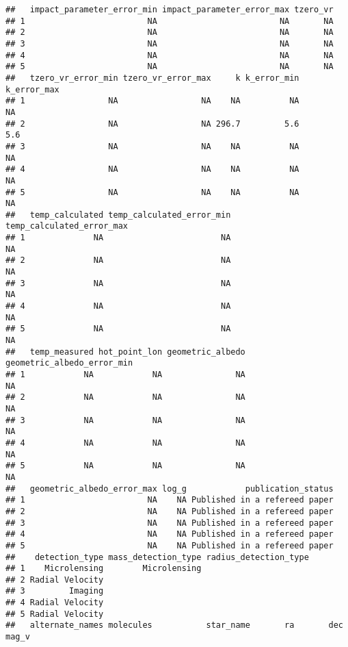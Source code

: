 \documentclass[]{article}
\begin{document}
\begin{verbatim}
##   impact_parameter_error_min impact_parameter_error_max tzero_vr
## 1                         NA                         NA       NA
## 2                         NA                         NA       NA
## 3                         NA                         NA       NA
## 4                         NA                         NA       NA
## 5                         NA                         NA       NA
##   tzero_vr_error_min tzero_vr_error_max     k k_error_min k_error_max
## 1                 NA                 NA    NA          NA          NA
## 2                 NA                 NA 296.7         5.6         5.6
## 3                 NA                 NA    NA          NA          NA
## 4                 NA                 NA    NA          NA          NA
## 5                 NA                 NA    NA          NA          NA
##   temp_calculated temp_calculated_error_min temp_calculated_error_max
## 1              NA                        NA                        NA
## 2              NA                        NA                        NA
## 3              NA                        NA                        NA
## 4              NA                        NA                        NA
## 5              NA                        NA                        NA
##   temp_measured hot_point_lon geometric_albedo geometric_albedo_error_min
## 1            NA            NA               NA                         NA
## 2            NA            NA               NA                         NA
## 3            NA            NA               NA                         NA
## 4            NA            NA               NA                         NA
## 5            NA            NA               NA                         NA
##   geometric_albedo_error_max log_g            publication_status
## 1                         NA    NA Published in a refereed paper
## 2                         NA    NA Published in a refereed paper
## 3                         NA    NA Published in a refereed paper
## 4                         NA    NA Published in a refereed paper
## 5                         NA    NA Published in a refereed paper
##    detection_type mass_detection_type radius_detection_type
## 1    Microlensing        Microlensing                      
## 2 Radial Velocity                                          
## 3         Imaging                                          
## 4 Radial Velocity                                          
## 5 Radial Velocity                                          
##   alternate_names molecules           star_name       ra       dec mag_v

\end{verbatim}
\end{document}
